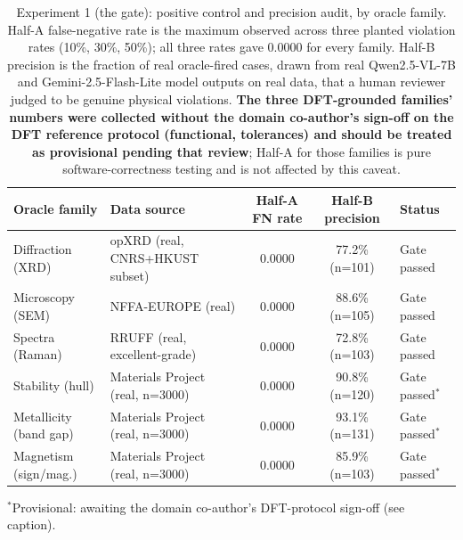 \begin{table}[t]
\centering
\caption{Experiment 1 (the gate): positive control and precision audit, by oracle
family. Half-A false-negative rate is the maximum observed across three planted
violation rates (10\%, 30\%, 50\%); all three rates gave 0.0000 for every family.
Half-B precision is the fraction of real oracle-fired cases, drawn from real
Qwen2.5-VL-7B and Gemini-2.5-Flash-Lite model outputs on real data, that a human
reviewer judged to be genuine physical violations. \textbf{The three DFT-grounded
families' numbers were collected without the domain co-author's sign-off on the
DFT reference protocol (functional, tolerances) and should be treated as
provisional pending that review}; Half-A for those families is pure
software-correctness testing and is not affected by this caveat.}
\label{tab:exp1}
{\scriptsize\setlength{\tabcolsep}{4pt}
\begin{tabular}{llccl}
\toprule
Oracle family & Data source & Half-A FN rate & Half-B precision & Status \\
\midrule
Diffraction (XRD)       & opXRD (real, CNRS+HKUST subset)     & 0.0000 & 77.2\% (n=101) & Gate passed \\
Microscopy (SEM)        & NFFA-EUROPE (real)                   & 0.0000 & 88.6\% (n=105) & Gate passed \\
Spectra (Raman)         & RRUFF (real, excellent-grade)        & 0.0000 & 72.8\% (n=103) & Gate passed \\
Stability (hull)        & Materials Project (real, n=3000)     & 0.0000 & 90.8\% (n=120) & Gate passed$^{*}$ \\
Metallicity (band gap)  & Materials Project (real, n=3000)     & 0.0000 & 93.1\% (n=131) & Gate passed$^{*}$ \\
Magnetism (sign/mag.)   & Materials Project (real, n=3000)     & 0.0000 & 85.9\% (n=103) & Gate passed$^{*}$ \\
\bottomrule
\end{tabular}}
\end{table}
{\scriptsize $^{*}$Provisional: awaiting the domain co-author's DFT-protocol sign-off (see caption).}

